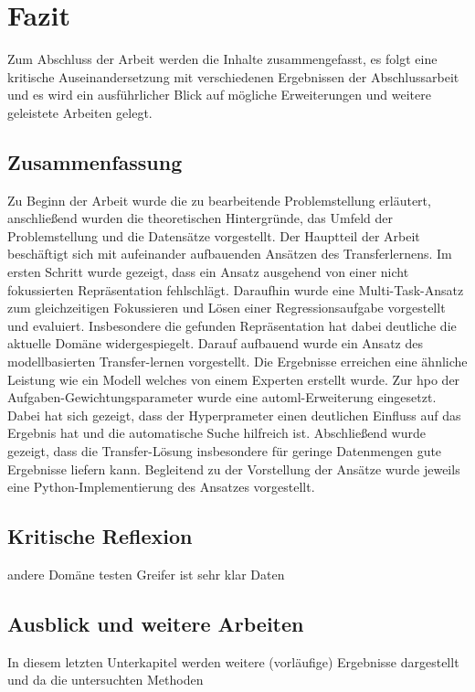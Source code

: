 \chapter{Fazit}
\label{chap:Fazit}
Zum Abschluss der Arbeit werden die Inhalte zusammengefasst, es folgt eine kritische Auseinandersetzung mit verschiedenen Ergebnissen der Abschlussarbeit und es wird ein ausführlicher Blick auf mögliche Erweiterungen und weitere geleistete Arbeiten gelegt.
 
	\section{Zusammenfassung}
	\label{sec:Zusammenfassung}
	Zu Beginn der Arbeit wurde die zu bearbeitende Problemstellung erläutert, anschließend wurden die theoretischen Hintergründe, das Umfeld der Problemstellung und die Datensätze vorgestellt. Der Hauptteil der Arbeit beschäftigt sich mit aufeinander aufbauenden Ansätzen des Transferlernens. Im ersten Schritt wurde gezeigt, dass ein Ansatz ausgehend von einer nicht fokussierten Repräsentation fehlschlägt. Daraufhin wurde eine Multi-Task-Ansatz zum gleichzeitigen Fokussieren und Lösen einer Regressionsaufgabe vorgestellt und evaluiert. Insbesondere die gefunden Repräsentation hat dabei deutliche die aktuelle Domäne widergespiegelt. Darauf aufbauend wurde ein Ansatz des modellbasierten Transfer-lernen vorgestellt. Die Ergebnisse erreichen eine ähnliche Leistung wie ein Modell welches von einem Experten erstellt wurde. Zur \ac{hpo} der Aufgaben-Gewichtungsparameter wurde eine \ac{automl}-Erweiterung eingesetzt. Dabei hat sich gezeigt, dass der Hyperprameter einen deutlichen Einfluss auf das Ergebnis hat und die automatische Suche hilfreich ist. Abschließend wurde gezeigt, dass die Transfer-Lösung insbesondere für geringe Datenmengen gute Ergebnisse liefern kann. Begleitend zu der Vorstellung der Ansätze wurde jeweils eine Python-Implementierung des Ansatzes vorgestellt. 
			
	\section{Kritische Reflexion}
	\label{sec:KritischeReflexion}
	
	andere Domäne testen Greifer ist sehr klar		
	Daten	
				
	\section{Ausblick und weitere Arbeiten}
	\label{sec:AusblickWeitereArbeiten}
	In diesem letzten Unterkapitel werden weitere (vorläufige) Ergebnisse dargestellt und da die untersuchten Methoden 
	

